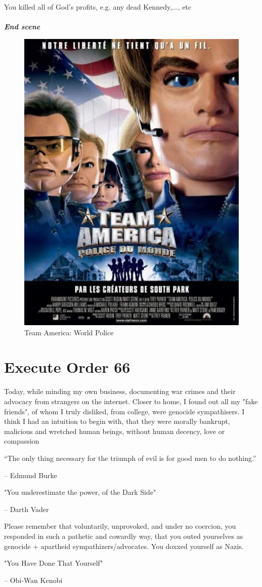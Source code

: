 \documentclass[16pt,openany,oneside]{book}
\begin{document}
\noindent You killed all of God's profits, e.g. any dead Kennedy,..., etc
\\\\
\textbf{\textit{End scene}}

\begin{figure}[H]
    \centering
    \includegraphics[width=0.3\linewidth]{assets/south_park/team_america.jpg}
    \caption{Team America: World Police}
    \label{fig:team-america}
\end{figure}

\chapter{Execute Order 66}

Today, while minding my own business, documenting war crimes and their advocacy from strangers on the internet. Closer to home, I found out all my "fake friends", of whom I truly disliked, from college, were genocide sympathisers. 
I think I had an intuition to begin with, that they were morally bankrupt, malicious and wretched human beings, without human decency, love or compassion

\epigraph{“The only thing necessary for the triumph of evil is for good men to do nothing.”}{ – Edmund Burke}

\epigraph{"You underestimate the power, of the Dark Side"}{-- Darth Vader}

Please remember that voluntarily, unprovoked, and under no coercion, you responded in such a pathetic and cowardly way, that you outed yourselves as genocide + apartheid sympathizers/advocates. You doxxed yourself as Nazis.

\epigraph{"You Have Done That Yourself"}{-- Obi-Wan Kenobi}
\end{document}
